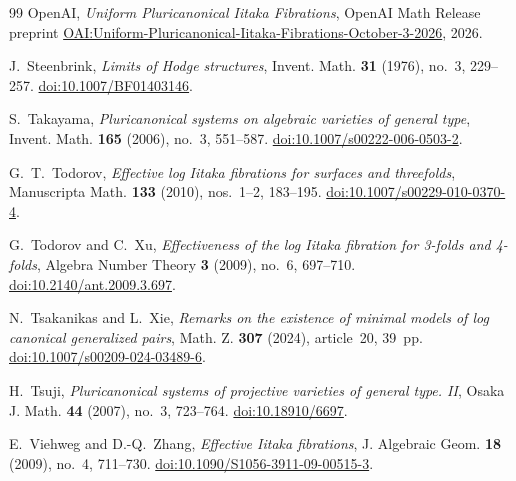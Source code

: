 \begin{thebibliography}{99}
OpenAI, \emph{Uniform Pluricanonical Iitaka Fibrations},
OpenAI Math Release preprint
\href{https://github.com/openai/math/blob/main/preprints/Uniform-Pluricanonical-Iitaka-Fibrations-October-3-2026/paper.pdf}{OAI:Uniform-Pluricanonical-Iitaka-Fibrations-October-3-2026},
2026.

J.~Steenbrink, \emph{Limits of Hodge structures},
Invent. Math. \textbf{31} (1976), no.~3, 229--257.
\href{https://doi.org/10.1007/BF01403146}{doi:10.1007/BF01403146}.

S.~Takayama, \emph{Pluricanonical systems on algebraic varieties of general type},
Invent. Math. \textbf{165} (2006), no.~3, 551--587.
\href{https://doi.org/10.1007/s00222-006-0503-2}{doi:10.1007/s00222-006-0503-2}.

G.~T.~Todorov, \emph{Effective log Iitaka fibrations for surfaces and threefolds},
Manuscripta Math. \textbf{133} (2010), nos.~1--2, 183--195.
\href{https://doi.org/10.1007/s00229-010-0370-4}{doi:10.1007/s00229-010-0370-4}.

G.~Todorov and C.~Xu,
\emph{Effectiveness of the log Iitaka fibration for 3-folds and 4-folds},
Algebra Number Theory \textbf{3} (2009), no.~6, 697--710.
\href{https://doi.org/10.2140/ant.2009.3.697}{doi:10.2140/ant.2009.3.697}.

N.~Tsakanikas and L.~Xie,
\emph{Remarks on the existence of minimal models of log canonical generalized pairs},
Math. Z. \textbf{307} (2024), article~20, 39~pp.
\href{https://doi.org/10.1007/s00209-024-03489-6}{doi:10.1007/s00209-024-03489-6}.

H.~Tsuji, \emph{Pluricanonical systems of projective varieties of general type. II},
Osaka J. Math. \textbf{44} (2007), no.~3, 723--764.
\href{https://doi.org/10.18910/6697}{doi:10.18910/6697}.

E.~Viehweg and D.-Q.~Zhang, \emph{Effective Iitaka fibrations},
J. Algebraic Geom. \textbf{18} (2009), no.~4, 711--730.
\href{https://doi.org/10.1090/S1056-3911-09-00515-3}{doi:10.1090/S1056-3911-09-00515-3}.

\end{thebibliography}

